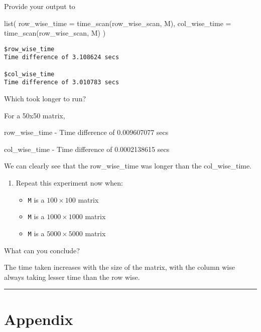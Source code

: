 \documentclass[
  letterpaper,
  DIV=11,
  numbers=noendperiod]{scrartcl}
\newenvironment{Shaded}{\begin{snugshade}}{\end{snugshade}}
\newcommand{\AttributeTok}[1]{\textcolor[rgb]{0.40,0.45,0.13}{#1}}
\newcommand{\FunctionTok}[1]{\textcolor[rgb]{0.28,0.35,0.67}{#1}}
\newcommand{\NormalTok}[1]{\textcolor[rgb]{0.00,0.23,0.31}{#1}}
\providecommand{\tightlist}{%
  \setlength{\itemsep}{0pt}\setlength{\parskip}{0pt}}\usepackage{longtable,booktabs,array}
\begin{document}
Provide your output to

\begin{Shaded}
\begin{Highlighting}[]
\FunctionTok{list}\NormalTok{(}
    \AttributeTok{row\_wise\_time =} \FunctionTok{time\_scan}\NormalTok{(row\_wise\_scan, M),}
    \AttributeTok{col\_wise\_time =} \FunctionTok{time\_scan}\NormalTok{(row\_wise\_scan, M)}
\NormalTok{)}
\end{Highlighting}
\end{Shaded}

\begin{verbatim}
$row_wise_time
Time difference of 3.108624 secs

$col_wise_time
Time difference of 3.010783 secs
\end{verbatim}

Which took longer to run?

For a 50x50 matrix,

row\_wise\_time - Time difference of 0.009607077 secs

col\_wise\_time - Time difference of 0.0002138615 secs

We can clearly see that the row\_wise\_time was longer than the
col\_wise\_time.

\begin{enumerate}
\def\labelenumi{\arabic{enumi}.}
\setcounter{enumi}{5}
\tightlist
\item
  Repeat this experiment now when:

  \begin{itemize}
  \tightlist
  \item
    \texttt{M} is a \(100 \times 100\) matrix
  \item
    \texttt{M} is a \(1000 \times 1000\) matrix
  \item
    \texttt{M} is a \(5000 \times 5000\) matrix
  \end{itemize}
\end{enumerate}

What can you conclude?

The time taken increases with the size of the matrix, with the column
wise always taking lesser time than the row wise.

\begin{center}\rule{0.5\linewidth}{0.5pt}\end{center}

\hypertarget{appendix}{%
\section{Appendix}\label{appendix}}
\end{document}
